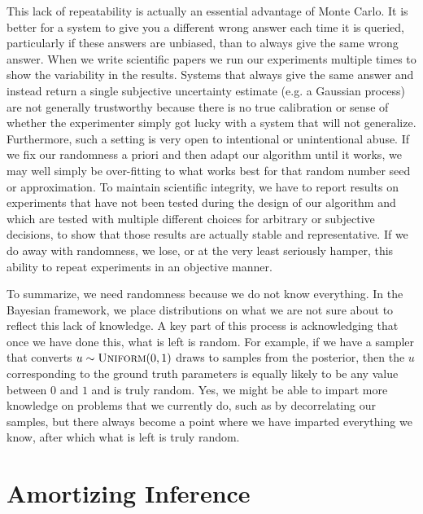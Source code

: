 This lack of repeatability is actually an essential advantage of Monte Carlo.  It is better for a system to give you
a different wrong answer each time it is queried, particularly if these answers
are unbiased, than to always give the same wrong answer.  When we write scientific papers we run our experiments
multiple times to show the variability in the results.  Systems that always give the same answer and instead return
a single subjective uncertainty estimate (e.g. a Gaussian process) are not generally trustworthy because there is no
true calibration or sense of whether the experimenter simply got lucky with a system that will not generalize.  
Furthermore, such a setting is very open to intentional or unintentional abuse.  If we fix our randomness
a priori and then adapt our algorithm until it works, we may well simply be over-fitting to what works best for that
random number seed or approximation. To maintain scientific integrity, we have to report results on 
experiments that have not been
tested during the design of our algorithm and which are tested with multiple different choices for arbitrary or subjective
decisions, to show that those results are actually stable and representative.  If we do away with randomness, we lose, or at the very least
seriously hamper, this ability to repeat experiments in an objective manner.

To summarize, we need randomness because we do not know everything.  In the Bayesian framework, we place distributions
on what we are not sure about to reflect this lack of knowledge.  A key part of this process is acknowledging that once we
have done this, what is left is random.   For example, if we have a sampler that converts $u\sim\textsc{Uniform}(0,1)$ draws
to samples from the posterior, then the $u$ corresponding to the ground truth parameters is equally likely to be any value
between $0$ and $1$ and is truly random.
Yes, we might be able to impart more knowledge on
problems that we currently do, such as by decorrelating our samples, but there always become a point where we have
imparted everything we know, after which what is left is truly random.


\section{Amortizing Inference}

